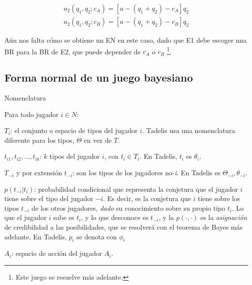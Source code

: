 \documentclass[12pt]{article}
\begin{document}
\begin{align*}
	u_2(q_1, q_2;c_A) =  [a - (q_1 + q_2) - c_A]q_2 \\
	u_2(q_1, q_2;c_B) =  [a - (q_1 + q_2) - c_B]q_2
\end{align*}

Aún nos falta cómo se obtiene un EN en este caso, dado que E1 debe escoger una BR para la BR de E2, que puede depender de $c_A$ o $c_B$ \footnote{Este juego se resuelve más adelante.}.

\subsection{Forma normal de un juego bayesiano}

\begin{summarybox}[colback=red!15]{Nomenclatura}

	Para todo jugador $i \in N$:

	\begin{myitemize}
		\item $T_i$: el conjunto o espacio de tipos del jugador $i$. Tadelis usa una nomenclatura diferente para los tipos, $\Theta \text{ en vez de } T$.
		\item $t_{i1}, t_{i2}, ..., t_{ik}$: $k$ tipos del jugador $i$, con $t_{i} \in T_i$. En Tadelis, $t_{i}$ es $\theta_{i}$.
		\item $T_{-i}$ y por extensión $t_{-i}$: son los tipos de los jugadores no-\textit{i}. En Tadelis es $\Theta_{-i}, \theta_{-i}$.
		\item $p(t_{-i}|t_i)$: probabilidad condicional que representa la conjetura que el jugador $i$ tiene sobre el tipo del jugador $-i$. Es decir, es la conjetura que $i$ tiene sobre los tipos $t_{-i}$ de los otros jugadores, \textit{dado} su conocimiento sobre su propio tipo $t_i$. Lo que el jugador $i$ sabe es $t_i$, y lo que desconoce es $t_{-i}$, y la $p(\cdot, \cdot)$ es la \textit{asignación} de credibilidad a las posibilidades, que se resolverá con el teorema de Bayes más adelante. En Tadelis, $p_i$ se denota con $\phi_i$
		\item $A_i$: espacio de acción del jugador $A_i$.
	\end{myitemize}
\end{summarybox}
\end{document}
